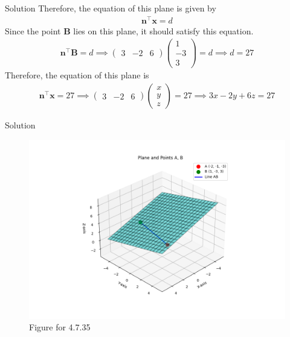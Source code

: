 \documentclass{beamer}
\let\vec\mathbf
\theoremstyle{remark}
\newcommand{\myvec}[1]{\ensuremath{\begin{pmatrix}#1\end{pmatrix}}}
\begin{document}
\begin{frame}{Solution}
Therefore, the equation of this plane is given by 
\begin{align}
    \vec{n}^{\top}\vec{x}=d
\end{align}
Since the point $\vec{B}$ lies on this plane, it should satisfy this equation.
\begin{align}
    \vec{n}^{\top}\vec{B}=d \implies \myvec{3 & -2 & 6}\myvec{1 \\ -3 \\ 3}=d \implies d=27
\end{align}
Therefore, the equation of this plane is 
\begin{align}
    \vec{n}^{\top}\vec{x}=27 \implies \myvec{3 & -2 & 6}\myvec{x \\ y \\ z}=27 \implies 3x - 2y +6z=27
\end{align}
\end{frame}
\begin{frame}{Solution}
\begin{figure}[H]
    \centering
    \includegraphics[width=0.8\columnwidth]{figs/1.png}
    \caption{Figure for 4.7.35}
    \label{fig:placeholder}
\end{figure}
\end{frame}
\end{document}

